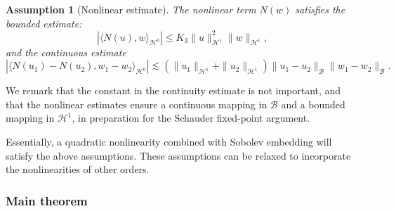 \documentclass[11pt,a4paper]{article}
\numberwithin{equation}{section}
\newtheorem{assumption}{Assumption}
\begin{document}
\begin{assumption}[Nonlinear estimate]
  \label{asm:nonlinear}The nonlinear term $N (w)$ satisfies the bounded estimate:
  \begin{equation*}
    | \langle N (u), w \rangle_{\mathcal{H}^0} | \leqslant K_3 \| u
    \|_{\mathcal{H}^1}^2 \| w \|_{\mathcal{H}^1}, \label{eq:Nu asm}
  \end{equation*}
  and the continuous estimate
  \begin{equation*}
    | \langle N (u_1) - N (u_2), w_1 - w_2 \rangle_{\mathcal{H}^0} | \lesssim
   (\| u_1 \|_{\mathcal{H}^1} + \| u_2 \|_{\mathcal{H}^1}) \| u_1 - u_2
    \|_{\mathcal{B}} \| w_1 - w_2 \|_{\mathcal{B}}. \label{eq:dtNu asm}
  \end{equation*}
\end{assumption}

\begin{remark}
We remark that the constant in the continuity estimate is not important, and that the nonlinear estimates ensure a continuous mapping in $\mathcal{B}$ and a bounded mapping in $\mathcal{H}^1$, in preparation for the Schauder fixed-point argument.

Essentially, a quadratic nonlinearity combined with Sobolev embedding will satisfy the above assumptions.
  These assumptions can be relaxed to incorporate the nonlinearities of other orders. %
\end{remark}


\subsubsection{Main theorem}
\end{document}
